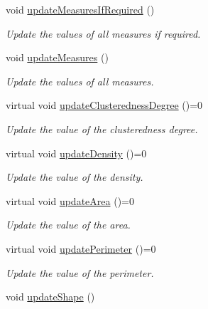 \begin{DoxyCompactItemize}
\item 
void \hyperlink{classmultiscale_1_1analysis_1_1SpatialEntityPseudo3D_a151cd8c0fdfbc98cfd0adc99b9943369}{update\-Measures\-If\-Required} ()
\begin{DoxyCompactList}\small\item\em Update the values of all measures if required. \end{DoxyCompactList}\item 
void \hyperlink{classmultiscale_1_1analysis_1_1SpatialEntityPseudo3D_a24ad8b8b5768be1f917a1fb893df8c6c}{update\-Measures} ()
\begin{DoxyCompactList}\small\item\em Update the values of all measures. \end{DoxyCompactList}\item 
virtual void \hyperlink{classmultiscale_1_1analysis_1_1SpatialEntityPseudo3D_a750ba1b5e457d9d6504fc8320a76e002}{update\-Clusteredness\-Degree} ()=0
\begin{DoxyCompactList}\small\item\em Update the value of the clusteredness degree. \end{DoxyCompactList}\item 
virtual void \hyperlink{classmultiscale_1_1analysis_1_1SpatialEntityPseudo3D_a28fa63c1101f3f5ba7a0001099ee3159}{update\-Density} ()=0
\begin{DoxyCompactList}\small\item\em Update the value of the density. \end{DoxyCompactList}\item 
virtual void \hyperlink{classmultiscale_1_1analysis_1_1SpatialEntityPseudo3D_aa8c1cd3248c8926edbb1b47006ded902}{update\-Area} ()=0
\begin{DoxyCompactList}\small\item\em Update the value of the area. \end{DoxyCompactList}\item 
virtual void \hyperlink{classmultiscale_1_1analysis_1_1SpatialEntityPseudo3D_acb00990b4b812367b7ae8f16028b8c32}{update\-Perimeter} ()=0
\begin{DoxyCompactList}\small\item\em Update the value of the perimeter. \end{DoxyCompactList}\item 
void \hyperlink{classmultiscale_1_1analysis_1_1SpatialEntityPseudo3D_ad50d0866df26b63dc86853a9ab0c545d}{update\-Shape} ()

\end{DoxyCompactItemize}
